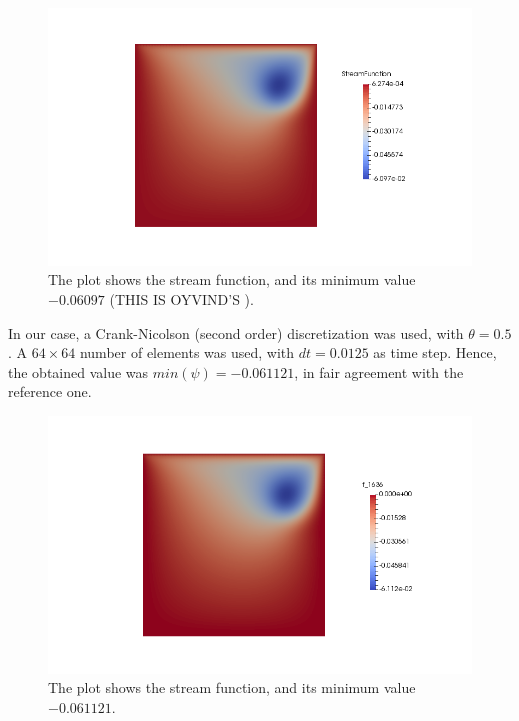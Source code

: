 \documentclass[11pt,a4paper,titlepage]{report}
\begin{document}
\begin{figure}[ht]
\centering
\includegraphics[width=\textwidth]{images/oyvind.png}
\vspace{-1cm}
\caption{The plot shows the stream function, and its minimum value $-0.06097$ (THIS IS OYVIND'S ).}
\end{figure}


In our case, a Crank-Nicolson (second order) discretization was used, with $\theta = 0.5$. A $64 \times 64$ number of elements was used, with $dt = 0.0125$ as time step. Hence, the obtained value was $min(\psi) = -0.061 121$, in fair agreement with the reference one. \\

\vspace{-.3cm}
\begin{figure}[ht]
\centering
\includegraphics[width=\textwidth]{images/mine.png}
\vspace{-1cm}
\caption{The plot shows the stream function, and its minimum value $-0.061 121$.}
\end{figure}
\end{document}
